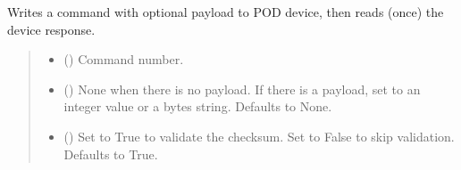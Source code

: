 \documentclass[letterpaper,10pt,english]{sphinxmanual}
\begin{document}
\begin{fulllineitems}
\begin{fulllineitems}
\label{\detokenize{BasicPodProtocol:BasicPodProtocol.POD_Basics.WriteRead}}
\pysigstartsignatures
{}
\pysigstopsignatures
\sphinxAtStartPar
Writes a command with optional payload to POD device, then reads (once) the device response.
\begin{quote}\begin{description}
\begin{itemize}
\item {} 
\sphinxAtStartPar
{} (\sphinxstyleliteralemphasis{\sphinxupquote{ | }}) \textendash{} Command number.

\item {} 
\sphinxAtStartPar
{} (\sphinxstyleliteralemphasis{\sphinxupquote{ | }}\sphinxstyleliteralemphasis{\sphinxupquote{ | }}\sphinxstyleliteralemphasis{\sphinxupquote{{[}}}\sphinxstyleliteralemphasis{\sphinxupquote{|}}\sphinxstyleliteralemphasis{\sphinxupquote{{]}}}\sphinxstyleliteralemphasis{\sphinxupquote{, }}) \textendash{} None when there is no payload. If there                 is a payload, set to an integer value or a bytes string. Defaults to None.

\item {} 
\sphinxAtStartPar
{} (\sphinxstyleliteralemphasis{\sphinxupquote{, }}) \textendash{} Set to True to validate the checksum. Set to False to skip                     validation. Defaults to True.


\end{itemize}
\end{description}
\end{quote}
\end{fulllineitems}
\end{fulllineitems}
\end{document}
